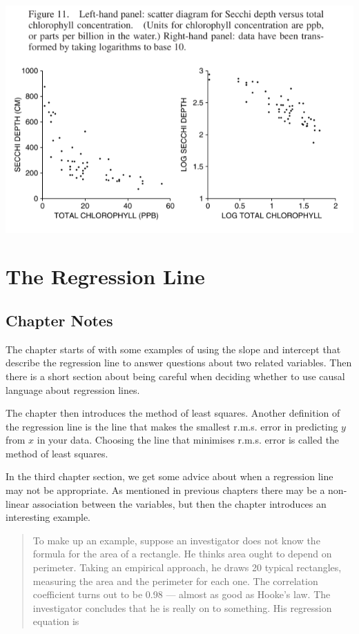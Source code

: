 \documentclass[
]{book}
\begin{document}
\includegraphics{images/Ch11Img06.png}

\hypertarget{regression_line}{%
\chapter{The Regression Line}\label{regression_line}}

\hypertarget{chapter-notes-11}{%
\section{Chapter Notes}\label{chapter-notes-11}}

The chapter starts of with some examples of using the slope and intercept that describe the regression line to answer questions about two related variables. Then there is a short section about being careful when deciding whether to use causal language about regression lines.

The chapter then introduces the method of least squares. Another definition of the regression line is the line that makes the smallest r.m.s. error in predicting \(y\) from \(x\) in your data. Choosing the line that minimises r.m.s. error is called the method of least squares.

In the third chapter section, we get some advice about when a regression line may not be appropriate. As mentioned in previous chapters there may be a non-linear association between the variables, but then the chapter introduces an interesting example.

\begin{quote}
To make up an example, suppose an investigator does not know the formula for the area of a rectangle. He thinks area ought to depend on perimeter. Taking an empirical approach, he draws 20 typical rectangles, measuring the area and the perimeter for each one. The correlation coefficient turns out to be 0.98 --- almost as good as Hooke's law. The investigator concludes that he is really on to something.
His regression equation is
\end{quote}
\end{document}
